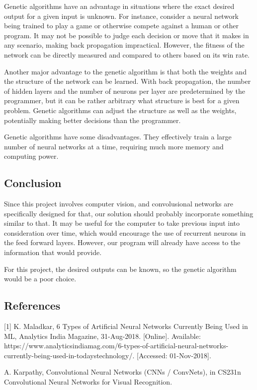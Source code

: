 \documentclass[10pt,journal,compsoc, draftclsnofoot,onecolumn]{IEEEtran}
\begin{document}
Genetic algorithms have an advantage in situations where the exact desired output for a given input is
unknown. For instance, consider a neural network being trained to play a game or otherwise compete against
a human or other program. It may not be possible to judge each decision or move that it makes in any
scenario, making back propagation impractical. However, the fitness of the network can be directly measured
and compared to others based on its win rate.

Another major advantage to the genetic algorithm is that both the weights and the structure of the network
can be learned. With back propagation, the number of hidden layers and the number of neurons per layer are
predetermined by the programmer, but it can be rather arbitrary what structure is best for a given problem.
Genetic algorithms can adjust the structure as well as the weights, potentially making better decisions than the
programmer.

Genetic algorithms have some disadvantages. They effectively train a large number of neural networks at a
time, requiring much more memory and computing power.

\subsection{Conclusion}
Since this project involves computer vision, and convolusional networks are specifically designed for that, our
solution should probably incorporate something similar to that. It may be useful for the computer to take
previous input into consideration over time, which would encourage the use of recurrent neurons in the feed
forward layers. However, our program will already have access to the information that would provide.

For this project, the desired outputs can be known, so the genetic algorithm would be a poor choice.

\subsection{References}
[1]	K. Maladkar, 6 Types of Artificial Neural Networks Currently Being Used in ML, Analytics India Magazine, 31-Aug-2018.
[Online]. Available: https://www.analyticsindiamag.com/6-types-of-artificial-neural-networks-currently-being-used-in-todaystechnology/.
[Accessed: 01-Nov-2018].

\noindent
[2]	A. Karpathy, Convolutional Neural Networks (CNNs / ConvNets), in CS231n Convolutional Neural Networks for Visual Recognition.
\end{document}

